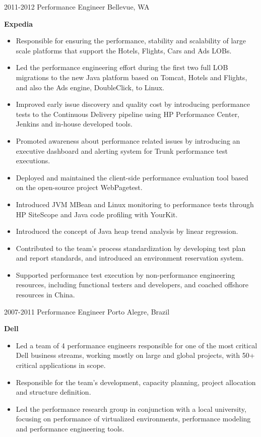 \begin{entrylist}
{    }
  \entry
    {2011-2012}
    {Performance Engineer}
    {Bellevue, WA}
    {
      \textbf{Expedia}
      \begin{itemize}
        \item Responsible for ensuring the performance, stability and scalability of large scale platforms that support the Hotels, Flights, Cars and Ads LOBs.
        \item Led the performance engineering effort during the first two full LOB migrations to the new Java platform based on Tomcat, Hotels and Flights, and also the Ads engine, DoubleClick, to Linux.
        \item Improved early issue discovery and quality cost by introducing performance tests to the Continuous Delivery pipeline using HP Performance Center, Jenkins and in-house developed tools.
        \item Promoted awareness about performance related issues by introducing an executive dashboard and alerting system for Trunk performance test executions.
        \item Deployed and maintained the client-side performance evaluation tool based on the open-source project WebPagetest.
        \item Introduced JVM MBean and Linux monitoring to performance tests through HP SiteScope and Java code profiling with YourKit.
        \item Introduced the concept of Java heap trend analysis by linear regression.
        \item Contributed to the team’s process standardization by developing test plan and report standards, and introduced an environment reservation system.
        \item Supported performance test execution by non-performance engineering resources, including functional testers and developers, and coached offshore resources in China.
      \end{itemize}
    }
  \entry
    {2007-2011}
    {Performance Engineer}
    {Porto Alegre, Brazil}
    {
      \textbf{Dell}
      \begin{itemize}
        \item Led a team of 4 performance engineers responsible for one of the most critical Dell business streams, working mostly on large and global projects, with 50+ critical applications in scope.
        \item Responsible for the team’s development, capacity planning, project allocation and structure definition.
        \item Led the performance research group in conjunction with a local university, focusing on performance of virtualized environments, performance modeling and performance engineering tools.

\end{itemize}}
\end{entrylist}
